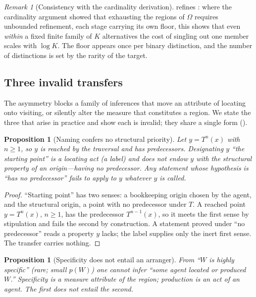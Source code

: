 \documentclass[11pt,twocolumn,a4paper]{article}
\theoremstyle{thmstyle}
\newtheorem{proposition}[theorem]{Proposition}
\theoremstyle{definition}
\theoremstyle{remark}
\newtheorem{remark}[theorem]{Remark}
\newcommand{\Space}{\Omega}
\begin{document}
\begin{remark}[Consistency with the cardinality derivation]
\label{rem:consistent-card}
 refines : where the cardinality argument
showed that exhausting the regions of $\Space$ requires unbounded refinement, each
stage carrying its own floor, this shows that even \emph{within} a fixed finite
family of $K$ alternatives the cost of singling out one member scales with
$\log K$. The floor appears once per binary distinction, and the number of
distinctions is set by the rarity of the target.
\end{remark}

\subsection{Three invalid transfers}

The asymmetry blocks a family of inferences that move an attribute of locating
onto visiting, or silently alter the measure that constitutes a region. We state
the three that arise in practice and show each is invalid; they share a single
form ().

\begin{proposition}[Naming confers no structural priority]
\label{prop:rename}
Let $y=T^{n}(x)$ with $n\ge1$, so $y$ is reached by the traversal and has
predecessors. Designating $y$ ``the starting point'' is a locating act
\textup{(}a label\textup{)} and does not endow $y$ with the structural property
of an origin---having no predecessor. Any statement whose hypothesis is ``has no
predecessor'' fails to apply to $y$ whatever $y$ is called.
\end{proposition}

\begin{proof}
``Starting point'' has two senses: a bookkeeping origin chosen by the agent, and
the structural origin, a point with no predecessor under $T$. A reached point
$y=T^{n}(x)$, $n\ge1$, has the predecessor $T^{n-1}(x)$, so it meets the first
sense by stipulation and fails the second by construction. A statement proved
under ``no predecessor'' reads a property $y$ lacks; the label supplies only the
inert first sense. The transfer carries nothing.
\end{proof}

\begin{proposition}[Specificity does not entail an arranger]
\label{prop:arrange}
From ``$W$ is highly specific'' \textup{(}rare; small $p(W)$\textup{)} one cannot
infer ``some agent located or produced $W$.'' Specificity is a measure attribute
of the region; production is an act of an agent. The first does not entail the
second.
\end{proposition}
\end{document}
